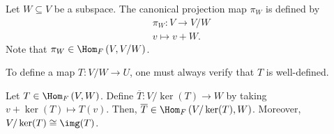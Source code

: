 \documentclass[10pt]{mypackage}
\begin{document}
\begin{definition}
  Let $W\subseteq V$ be a subspace. The canonical projection map $\pi_W$ is defined by
  \begin{align*}
    \pi_W: V\rightarrow V/W\\
    v\mapsto v + W.
  \end{align*}
  Note that $\pi_W\in \Hom_{F}\left(V,V/W\right)$.
\end{definition}
\begin{remark}
  To define a map $T: V/W\rightarrow U$, one must always verify that $T$ is well-defined.
\end{remark}
\begin{theorem}
  Let $T\in\Hom_{F}\left(V,W\right)$. Define $\overline{T}: V/\ker(T)\rightarrow W$ by taking $v + \ker(T) \mapsto T(v)$. Then, $\overline{T}\in \Hom_{F}\left(V/\ker(T),W\right)$. Moreover, $V/\ker(T)\cong \img(T)$.
\end{theorem}
\end{document}
